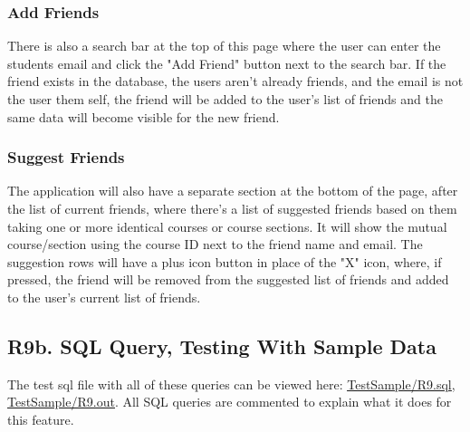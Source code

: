 \documentclass[12pt, a4paper]{article}
\begin{document}
\subsubsection*{Add Friends}
There is also a search bar at the top of this page where the user can enter the students email and click the "Add Friend" button next to the search bar. If the friend exists in the database, the users aren't already friends, and the email is not the user them self, the friend will be added to the user's list of friends and the same data will become visible for the new friend.
\subsubsection*{Suggest Friends}
The application will also have a separate section at the bottom of the page, after the list of current friends, where there's a list of suggested friends based on them taking one or more identical courses or course sections. It will show the mutual course/section using the course ID next to the friend name and email. The suggestion rows will have a plus icon button in place of the "X" icon, where, if pressed, the friend will be removed from the suggested list of friends and added to the user's current list of friends.
\subsection*{R9b. SQL Query, Testing With Sample Data}
The test sql file with all of these queries can be viewed here: \underline{\href{https://github.com/Kggupta/DegreeMap/tree/main/Database/Queries/TestSample}{TestSample/R9.sql}}, \underline{\href{https://github.com/Kggupta/DegreeMap/tree/main/Database/Queries/TestSample}{TestSample/R9.out}}. All SQL queries are commented to explain what it does for this feature.
\end{document}
